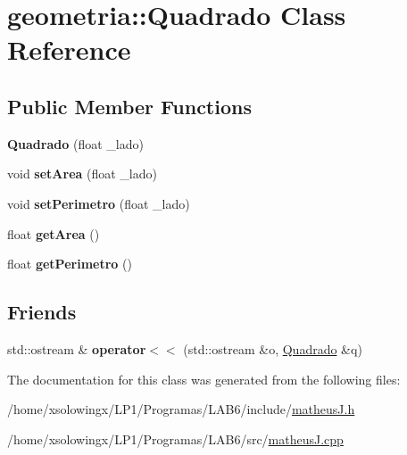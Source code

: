\hypertarget{classgeometria_1_1Quadrado}{}\section{geometria\+:\+:Quadrado Class Reference}
\label{classgeometria_1_1Quadrado}
\subsection*{Public Member Functions}
\begin{DoxyCompactItemize}
\item 
\mbox{\label{classgeometria_1_1Quadrado_a8ec5f59fb391fc577cc0c4f73809ecbe}} 
{\bfseries Quadrado} (float \+\_\+lado)
\item 
\mbox{\label{classgeometria_1_1Quadrado_a68d9b4f2988ff6cd6235422895b7f3ea}} 
void {\bfseries set\+Area} (float \+\_\+lado)
\item 
\mbox{\label{classgeometria_1_1Quadrado_a0b87072987e6bc8c04ab345f29956666}} 
void {\bfseries set\+Perimetro} (float \+\_\+lado)
\item 
\mbox{\label{classgeometria_1_1Quadrado_abab1299ecfddf7923a43e8d5bde63cf5}} 
float {\bfseries get\+Area} ()
\item 
\mbox{\label{classgeometria_1_1Quadrado_a6319d5f65fdf6529dbe8db2e91778bf1}} 
float {\bfseries get\+Perimetro} ()
\end{DoxyCompactItemize}
\subsection*{Friends}
\begin{DoxyCompactItemize}
\item 
\mbox{\label{classgeometria_1_1Quadrado_aa9c9001bfe58eb9e8d5e7632712922f1}} 
std\+::ostream \& {\bfseries operator$<$$<$} (std\+::ostream \&o, \hyperlink{classgeometria_1_1Quadrado}{Quadrado} \&q)
\end{DoxyCompactItemize}


The documentation for this class was generated from the following files\+:\begin{DoxyCompactItemize}
\item 
/home/xsolowingx/\+L\+P1/\+Programas/\+L\+A\+B6/include/\hyperlink{matheusJ_8h}{matheus\+J.\+h}\item 
/home/xsolowingx/\+L\+P1/\+Programas/\+L\+A\+B6/src/\hyperlink{matheusJ_8cpp}{matheus\+J.\+cpp}\end{DoxyCompactItemize}
